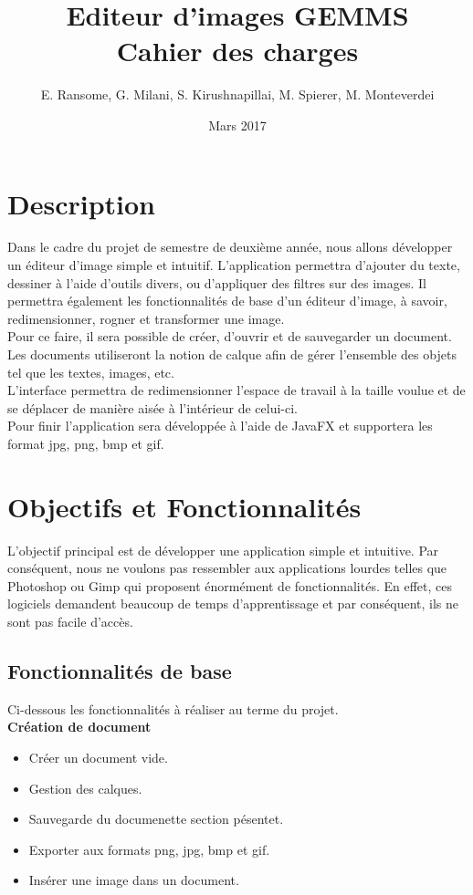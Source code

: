 \documentclass[11pt, a4paper, french]{article}
\title{Editeur d'images GEMMS \\ Cahier des charges}
\author{E. Ransome, G. Milani, S. Kirushnapillai, M. Spierer, M. Monteverdei}
\date{Mars 2017}
\begin{document}
	\maketitle
	\thispagestyle{empty}
	\tableofcontents
	\pagebreak

	\section{Description}
		Dans le cadre du projet de semestre de deuxième année, nous allons développer un éditeur d'image simple et intuitif. L'application permettra d'ajouter du texte, dessiner à l'aide d'outils divers, ou d'appliquer des filtres sur des images. Il permettra également les fonctionnalités de base d'un éditeur d'image, à savoir, redimensionner, rogner et transformer une image. \\

		Pour ce faire, il sera possible de créer, d'ouvrir et de sauvegarder un document. Les documents utiliseront la notion de calque afin de gérer l'ensemble des objets tel que les textes, images, etc. \\

		L’interface permettra de redimensionner l’espace de travail à la taille voulue et de se déplacer de manière aisée à l’intérieur de celui-ci. \\

		Pour finir l’application sera développée à l’aide de JavaFX et supportera les format jpg, png, bmp et gif.

	\section{Objectifs et Fonctionnalités}

		L'objectif principal est de développer une application simple et intuitive. Par conséquent, nous ne voulons pas ressembler aux applications lourdes telles que Photoshop ou Gimp qui proposent énormément de fonctionnalités. En effet, ces logiciels demandent beaucoup de temps d'apprentissage et par conséquent, ils ne sont pas facile d'accès.

		\subsection{Fonctionnalités de base}

			Ci-dessous les fonctionnalités à réaliser au terme du projet.\\

			\textbf{Création de document}
			\begin{itemize}[label=\textbullet]
				\item Créer un document vide.
				\item Gestion des calques.
				\item Sauvegarde du documenette section pésentet.
				\item Exporter aux formats png, jpg, bmp et gif.
				\item Insérer une image dans un document. \\
			\end{itemize}
\end{document}
